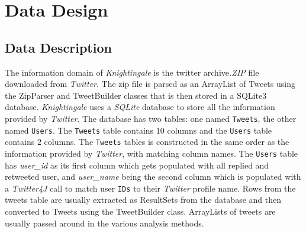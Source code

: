\documentclass[a4paper, 12pt]{article}
\begin{document}
\section{Data Design} \label{sec:datadesign}
\subsection{Data Description} \label{sec:datadescript}
\begin{adjustwidth}{2em}{0pt}

The information domain of \textit{Knightingale} is the  twitter archive\textit{.ZIP} file downloaded from \textit{Twitter}. The zip file is parsed as an ArrayList of Tweets using the ZipParser and TweetBuilder classes that is then stored in a SQLite3 database. 
\textit{Knightingale} uses a \textit{SQLite} database to store all the information provided by \textit{Twitter}. The database has two tables: one named \texttt{Tweets}, the other named \texttt{Users}. The \texttt{Tweets} table contains $10$ columns and the \texttt{Users} table contains $2$ columns. The \texttt{Tweets} tables is constructed in the same order as the information provided by \textit{Twitter}, with matching column names. The \texttt{Users} table has \textit{user\_id} as its first column which gets populated with all replied and retweeted user, and \textit{user\_name} being the second column which is populated with a \textit{Twitter4J} call to match user \texttt{IDs} to their \textit{Twitter} profile name. Rows from the tweets table are usually extracted as ResultSets from the database and then converted to Tweets using the TweetBuilder class. ArrayLists of tweets are usually passed around in the various analysis methods.

\end{adjustwidth}
\end{document}
